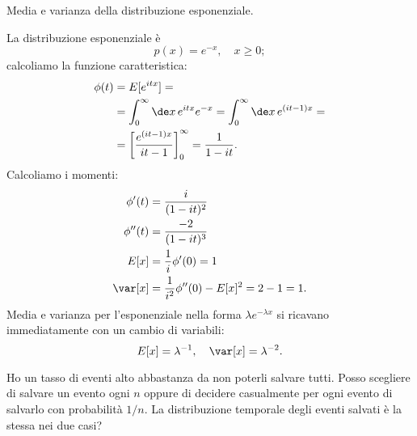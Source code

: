 \begin{exercise}
	Media e varianza della distribuzione esponenziale.
\end{exercise}

\begin{solution*}
	La distribuzione esponenziale è
	\begin{equation*}
		p(x) = e^{-x}, \quad x \ge 0;
	\end{equation*}
	calcoliamo la funzione caratteristica:
	\begin{align*}
		\phi(t) &=  E[e^{itx}] = \\
		&= \int_0^\infty \de x\, e^{itx}e^{-x} = \int_0^\infty \de x\, e^{(it-1)x} = \\
		&= \left[ \frac{e^{(it-1)x}}{it-1} \right]_0^\infty = \frac1{1-it}.
	\end{align*}
	Calcoliamo i momenti:
	\begin{align*}
		\phi'(t) &= \frac{i}{(1-it)^2} \\
		\phi''(t) &= \frac{-2}{(1-it)^3} \\
		E[x] &= \frac1i \phi'(0) = 1 \\
		\var[x] &= \frac1{i^2}\phi''(0) - E[x]^2 = 2 - 1 = 1.
	\end{align*}
	Media e varianza per l'esponenziale nella forma $\lambda e^{-\lambda x}$ si ricavano immediatamente con un cambio di variabili:
	\begin{equation*}
		E[x] = \lambda^{-1}, \quad \var[x] = \lambda^{-2}.
	\end{equation*}
\end{solution*}

\begin{exercise}
	\label{th:salvexp}
	Ho un tasso di eventi alto abbastanza da non poterli salvare tutti. Posso scegliere di salvare un evento ogni $n$ oppure di decidere casualmente per ogni evento di salvarlo con probabilità $1/n$. La distribuzione temporale degli eventi salvati è la stessa nei due casi?
\end{exercise}

